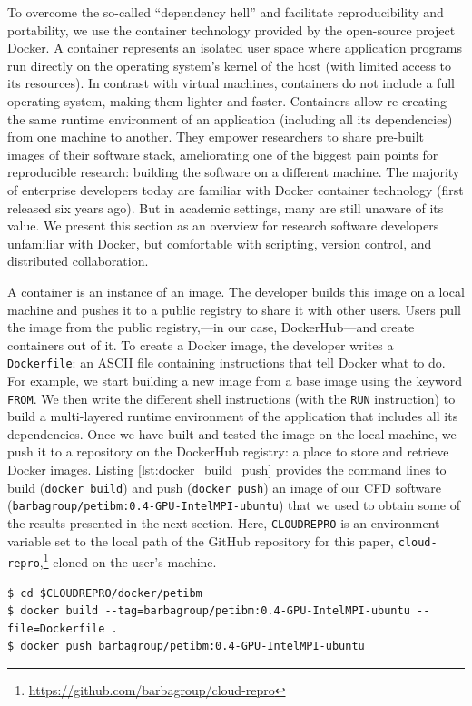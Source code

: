 \documentclass[10pt,journal,compsoc]{IEEEtran}
\begin{document}
To overcome the so-called ``dependency hell'' and facilitate reproducibility and portability, we use the container technology provided by the open-source project Docker.
A container represents an isolated user space where application programs run directly on the operating system's kernel of the host (with limited access to its resources).
In contrast with virtual machines, containers do not include a full operating system, making them lighter and faster.
Containers allow re-creating the same runtime environment of an application (including all its dependencies) from one machine to another. 
They empower researchers to share pre-built images of their software stack, ameliorating one of the biggest pain points for reproducible research: building the software on a different machine. 
The majority of enterprise developers today are familiar with Docker container technology (first released six years ago). 
But in academic settings, many are still unaware of its value. 
We present this section as an overview for research software developers unfamiliar with Docker, but comfortable with scripting, version control, and distributed collaboration.

A container is an instance of an image.
The developer builds this image on a local machine and pushes it to a public registry to share it with other users.
Users pull the image from the public registry,---in our case, DockerHub---and create containers out of it.
To create a Docker image, the developer writes a \texttt{Dockerfile}: an ASCII file containing instructions that tell Docker what to do.
For example, we start building a new image from a base image using the keyword \texttt{FROM}.
We then write the different shell instructions (with the \texttt{RUN} instruction) to build a multi-layered runtime environment of the application that includes all its dependencies.
Once we have built and tested the image on the local machine, we push it to a repository on the DockerHub registry: a place to store and retrieve Docker images.
Listing \ref{lst:docker_build_push} provides the command lines to build (\texttt{docker build}) and push (\texttt{docker push}) an image of our CFD software (\texttt{barbagroup/petibm:0.4-GPU-IntelMPI-ubuntu}) that we used to obtain some of the results presented in the next section.
Here, \texttt{CLOUDREPRO} is an environment variable set to the local path of the GitHub repository for this paper, \texttt{cloud-repro},\footnote{\url{https://github.com/barbagroup/cloud-repro}} cloned on the user's machine.

\begin{lstlisting}[label=lst:docker_build_push,caption={Build and push a Docker image.}]
$ cd $CLOUDREPRO/docker/petibm
$ docker build --tag=barbagroup/petibm:0.4-GPU-IntelMPI-ubuntu --file=Dockerfile .
$ docker push barbagroup/petibm:0.4-GPU-IntelMPI-ubuntu
\end{lstlisting}
\end{document}

